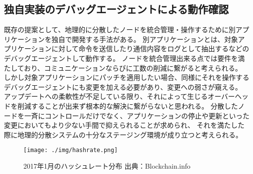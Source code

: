 \subsection{独自実装のデバッグエージェントによる動作確認}
既存の提案として、地理的に分散したノードを統合管理・操作するために別アプリケーションを独自で開発する手法がある。
別アプリケーションとは、対象アプリケーションに対して命令を送信したり通信内容をログとして抽出するなどのデバッグエージェントして動作する。
ノードを統合管理出来る点では要件を満たしており、コミュニケーションならびに工数の削減に繋がると考えられる。
しかし対象アプリケーションにパッチを適用したい場合、同様にそれを操作するデバッグエージェントにも変更を加える必要があり、変更への弱さが窺える。
アップデートへの柔軟性が不足している限り、それによって生じるオーバーヘッドを削減することが出来ず根本的な解決に繋がらないと思われる。
分散したノードを一斉にコントロールだけでなく、アプリケーションの停止や更新といった変更においてもより少ない手間で抑えられることが求められ、
それを満たした際に地理的分散システムの十分なステージング環境が成り立つと考えられる。

\begin{figure}[h]
    \begin{center}
        \texttt{[image: ./img/hashrate.png]}
        \caption{2017年1月のハッシュレート分布 出典：Blockchain.info\cite{bitcoinhashrate}}
        \label{img:hashrate}
    \end{center}
\end{figure}
\fi
